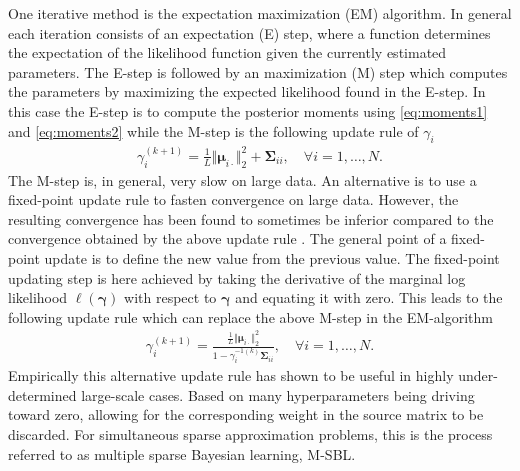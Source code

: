 One iterative method is the expectation maximization (EM) algorithm.
In general each iteration consists of an expectation (E) step, where a function determines the expectation of the likelihood function given the currently estimated parameters. 
The E-step is followed by an maximization (M) step which computes the parameters by maximizing the expected likelihood found in the E-step.
In this case the E-step is to compute the posterior moments using \eqref{eq:moments1} and \eqref{eq:moments2} while the M-step is the following update rule of $\gamma_i$ \cite[p.147]{phd_wipf}
\begin{align*}
\gamma_i^{(k+1)} = \frac{1}{L} \Vert \boldsymbol{\mu}_{i \cdot} \Vert_2^2 + \boldsymbol{\Sigma}_{ii}, \quad \forall i = 1, \dots, N.
\end{align*}
The M-step is, in general, very slow on large data. 
An alternative is to use a fixed-point update rule to fasten convergence on large data. 
However, the resulting convergence has been found to sometimes be inferior compared to the convergence obtained by the above update rule \cite[p.147]{phd_wipf}. 
The general point of a fixed-point update is to define the new value from the previous value. 
The fixed-point updating step is here achieved by taking the derivative of the marginal log likelihood $\ell(\boldsymbol{\gamma})$ with respect to $\boldsymbol{\gamma}$ and equating it with zero. 
This leads to the following update rule which can replace the above M-step in the EM-algorithm \cite[p.147]{phd_wipf}
\begin{align}
\gamma_i^{(k+1)} = \frac{\frac{1}{L} \Vert \boldsymbol{\mu}_{i \cdot} \Vert_2^2}{1 - \gamma_i^{-1 (k)} \boldsymbol{\Sigma}_{ii}}, \quad \forall i = 1, \dots, N.
\end{align}
Empirically this alternative update rule has shown to be useful in highly under-determined large-scale cases. 
Based on many hyperparameters being driving toward zero, allowing for the corresponding weight in the source matrix to be discarded. 
For simultaneous sparse approximation problems, this is the process referred to as multiple sparse Bayesian learning, M-SBL.

